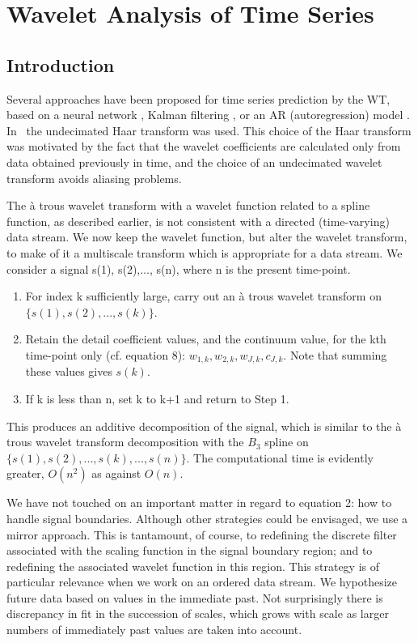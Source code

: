   
\section{Wavelet Analysis of Time Series}  

\subsection{Introduction}

Several approaches have been proposed for time 
series  prediction by the WT, based on a   
neural network \cite{starck:gonghui99,pred:bashir00},
Kalman filtering \cite{pred:cristi00,pred:hong98}, or
an AR (autoregression) model \cite{pred:soltani00}.
In~\cite{starck:gonghui99,pred:soltani00} the undecimated Haar transform
was used. This choice of the Haar transform 
was motivated by the fact that the wavelet
coefficients are calculated only from data obtained previously in time,
and the choice of an undecimated wavelet transform avoids aliasing problems.
 
The \`a trous wavelet transform with a wavelet function related to a spline 
function, as described earlier, is not consistent with a directed
(time-varying) data stream. We now keep the wavelet function, but alter the 
wavelet transform, to make of it a multiscale transform
which is appropriate for a data stream. We consider a signal s(1), 
s(2),..., s(n), where n is the present time-point.
\begin{enumerate}
\item For index k sufficiently large, carry out an \`a trous wavelet transform 
 on $\{s(1), s(2), ... , s(k)\}$.
\item Retain the detail coefficient values, and the continuum value, for the 
   kth time-point only (cf. equation 8): $w_{1,k},w_{2,k},w_{J,k},c_{J,k}$.
     Note that summing these values gives $s(k)$.
\item If k is less than n, set k to k+1 and return to Step 1.
\end{enumerate}

This produces an additive decomposition of the signal, which is similar to 
the \`a trous wavelet transform decomposition
with the $B_3$ spline on $\{s(1),s(2),...,s(k),...,s(n)\}$. The computational time 
is evidently greater, $O(n^2)$ as against $O(n)$. 

We have not touched on an important matter in regard to equation 2: how 
to handle signal boundaries. Although other strategies could be
envisaged, we use a mirror approach. This is tantamount, of course, to 
redefining the discrete filter associated with
the scaling function in the signal boundary region; and to redefining 
the associated wavelet function in this region. This strategy is of
particular relevance when we work on an ordered data stream. We hypothesize 
future data based on values in the immediate past. Not
surprisingly there is discrepancy in fit in the succession of scales, which 
grows with scale as larger numbers of immediately past values
are taken into account.  

